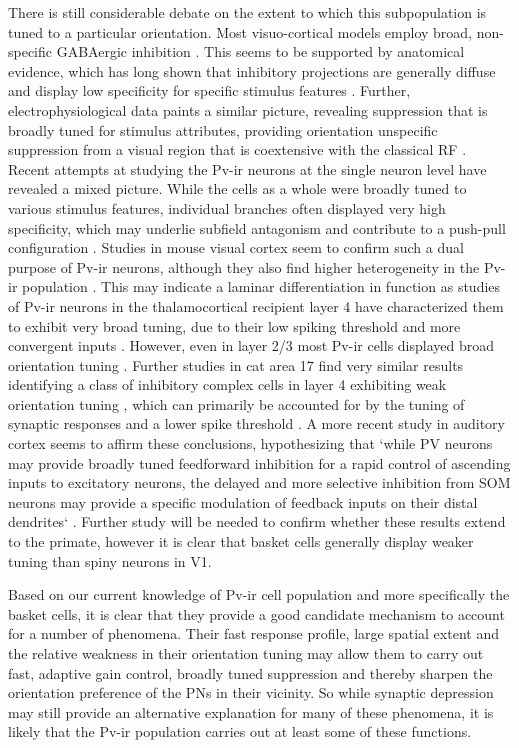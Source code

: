 There is still considerable debate on the extent to which this
subpopulation is tuned to a particular orientation. Most
visuo-cortical models employ broad, non-specific GABAergic inhibition
\citep{Somers1998,Troyer1998}. This seems to be supported by
anatomical evidence, which has long shown that inhibitory projections
are generally diffuse and display low specificity for specific
stimulus features \citep{Albus1994,Kisvarday1997a}. Further,
electrophysiological data paints a similar picture, revealing
suppression that is broadly tuned for stimulus attributes, providing
orientation unspecific suppression from a visual region that is
coextensive with the classical RF \citep{DeAngelis1992}. Recent
attempts at studying the Pv-ir neurons at the single neuron level have
revealed a mixed picture. While the cells as a whole were broadly
tuned to various stimulus features, individual branches often
displayed very high specificity, which may underlie subfield
antagonism and contribute to a push-pull configuration
\citep{Kisvarday2002}. Studies in mouse visual cortex seem to confirm
such a dual purpose of Pv-ir neurons, although they also find higher
heterogeneity in the Pv-ir population \citep{Runyan2010}. This may
indicate a laminar differentiation in function as studies of Pv-ir
neurons in the thalamocortical recipient layer 4 have characterized
them to exhibit very broad tuning, due to their low spiking threshold
and more convergent inputs \citep{Ma2011}. However, even in layer 2/3
most Pv-ir cells displayed broad orientation tuning
\citep{Hofer2011}. Further studies in cat area 17 find very similar
results identifying a class of inhibitory complex cells in layer 4
exhibiting weak orientation tuning \citep{Hirsch2003}, which can
primarily be accounted for by the tuning of synaptic responses and a
lower spike threshold \citep{Nowak2008}. A more recent study in
auditory cortex seems to affirm these conclusions, hypothesizing that
`while PV neurons may provide broadly tuned feedforward inhibition for
a rapid control of ascending inputs to excitatory neurons, the delayed
and more selective inhibition from SOM neurons may provide a specific
modulation of feedback inputs on their distal dendrites`
\citep{Li2014}. Further study will be needed to confirm whether these
results extend to the primate, however it is clear that basket cells
generally display weaker tuning than spiny neurons in V1.

Based on our current knowledge of Pv-ir cell population and more
specifically the basket cells, it is clear that they provide a good
candidate mechanism to account for a number of phenomena. Their fast
response profile, large spatial extent and the relative weakness in
their orientation tuning may allow them to carry out fast, adaptive
gain control, broadly tuned suppression and thereby sharpen the
orientation preference of the PNs in their vicinity. So while synaptic
depression may still provide an alternative explanation for many of
these phenomena, it is likely that the Pv-ir population carries out at
least some of these functions.

